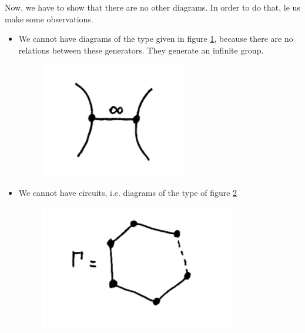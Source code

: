 \documentclass[envcountsame,envcountchap]{svmono}
\begin{document}
Now, we have to show that there are no other diagrams. In order to do that, le us make some observations.
\begin{itemize}
\item We cannot have diagrams of the type given in figure \ref{cours9fig2}, because there are no relations between these generators. They generate an infinite group. 

\begin{figure}[h!]
\centering
\includegraphics[scale=0.6]{cours9fig2.png}
\caption{}
\label{cours9fig2}
\end{figure}    

\item We cannot have circuits, i.e. diagrams of the type of figure \ref{cours9fig3}


\begin{figure}[h!]
\centering
\includegraphics[scale=0.6]{cours9fig3.png}
\caption{}
\label{cours9fig3}
\end{figure}    


\end{itemize}
\end{document}
